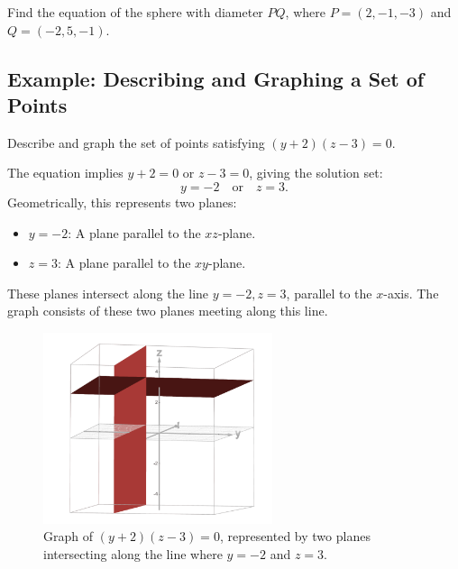 \documentclass{article}
\begin{document}
\begin{exercisebox}
    Find the equation of the sphere with diameter \(PQ\), where \(P = (2, -1, -3)\) and \(Q = (-2, 5, -1)\).
\end{exercisebox}

\subsection*{Example: Describing and Graphing a Set of Points}

\begin{examplebox}
    Describe and graph the set of points satisfying \((y + 2)(z - 3) = 0\).

    \begin{solutionbox}
        The equation implies \( y + 2 = 0 \) or \( z - 3 = 0 \), giving the solution set:
        \[
        y = -2 \quad \text{or} \quad z = 3.
        \]
        Geometrically, this represents two planes:
        \begin{itemize}
            \item \( y = -2 \): A plane parallel to the \( xz \)-plane.
            \item \( z = 3 \): A plane parallel to the \( xy \)-plane.
        \end{itemize}
        These planes intersect along the line \( y = -2, z = 3 \), parallel to the \( x \)-axis. The graph consists of these two planes meeting along this line.

        \begin{figure}[H]
            \centering
            \includegraphics[width=0.6\textwidth]{(y+2)(z-3)=0.png}
            \caption{Graph of \( (y + 2)(z - 3) = 0 \), represented by two planes intersecting along the line where \(y = -2\) and \(z = 3\).}
            \label{fig:two_planes}
        \end{figure}
    \end{solutionbox}
\end{examplebox}
\end{document}
